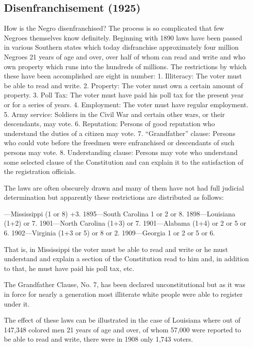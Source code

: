 \documentclass[letterpaper,10pt,english]{jupyterBook}
\begin{document}
\subsection{Disenfranchisement (1925)}
\label{\detokenize{Volumes/30/02/disenfranchisement:disenfranchisement-1925}}\label{\detokenize{Volumes/30/02/disenfranchisement::doc}}
\sphinxAtStartPar
How is the Negro disenfranchised? The process is so complicated that few Negroes themselves know definitely. Beginning with 1890 laws have been passed in various Southern states which today disfranchise approximately four million Negroes 21 years of age and over, over half of whom can read and write and who own property which runs into the hundreds of millions. The restrictions by which these have been accomplished are eight in number: 1. Illiteracy: The voter must be able to read and write. 2. Property: The voter must own a certain amount of property. 3. Poll Tax: The voter must have paid his poll tax for the present year or for a series of years. 4. Employment: The voter must have regular employment. 5. Army service: Soldiers in the Civil War and certain other wars, or their descendants, may vote. 6. Reputation: Persons of good reputation who understand the duties of a citizen may vote. 7. “Grandfather” clause: Persons who could vote before the freedmen were enfranchised or descendants of such persons may vote. 8. Understanding clause: Persons may vote who understand some selected clause of the Constitution and can explain it to the satisfaction of the registration officials.

\sphinxAtStartPar
The laws are often obscurely drawn and many of them have not had full judicial determination but apparently these restrictions are distributed as follows:

—Mississippi (1 or 8) +3.
1895—South Carolina 1 or 2 or 8.
1898—Louisiana (1+2) or 7.
1901—North Carolina (1+3) or 7.
1901—Alabama (1+4) or 2 or 5 or 6.
1902—Virginia (1+3 or 5) or 8 or 2.
1909—Georgia 1 or 2 or 5 or 6.

\sphinxAtStartPar
That is, in Mississippi the voter must be able to read and write or he must understand and explain a section of the Constitution read to him and, in addition to that, he must have paid his poll tax, etc.

\sphinxAtStartPar
The Grandfather Clause, No. 7, has been declared unconstitutional but as it was in force for nearly a generation most illiterate white people were able to register under it.

\sphinxAtStartPar
The effect of these laws can be illustrated in the case of Louisiana where out of 147,348 colored men 21 years of age and over, of whom 57,000 were reported to be able to read and write, there were in 1908 only 1,743 voters.
\end{document}
